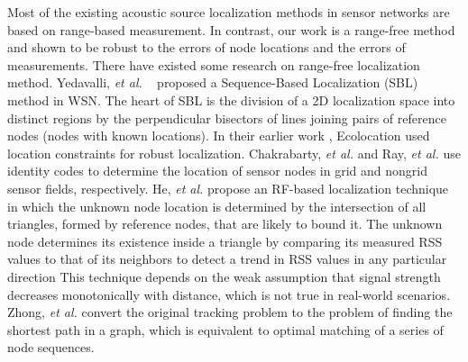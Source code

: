 Most of the existing acoustic source localization methods in sensor networks are based on range-based measurement.
In contrast, our work is a range-free method and shown to be robust to the errors of node locations and the errors of measurements.
There have existed some research on range-free localization method.
Yedavalli, \emph{et al.} ~\cite{yedavalli2008sequence} proposed a Sequence-Based Localization (SBL) method in WSN. 
The heart of SBL is the division of a 2D localization space into distinct regions by the perpendicular bisectors of lines joining pairs of reference nodes (nodes with known locations).
In their earlier work \cite{yedavalli2005ecolocation}, Ecolocation used location constraints for robust localization.
Chakrabarty, \emph{et al.} \cite{chakrabarty2002grid} and Ray, \emph{et al.} \cite{ray2004robust} use identity codes to determine the location of sensor nodes in grid and nongrid sensor fields, respectively. 
He, \emph{et al.} \cite{he2003range} propose an RF-based localization technique in which the unknown node location is determined by the intersection of all triangles,
formed by reference nodes, that are likely to bound it. The unknown node determines its existence inside a triangle by
comparing its measured RSS values to that of its neighbors to detect a trend in RSS values in any particular direction
This technique depends on the weak assumption that signal strength decreases monotonically with distance, which is not true in real-world scenarios.
Zhong, \emph{et al.} \cite{zhong2009tracking} convert the original tracking problem to the problem of finding the shortest path in a graph, which is equivalent to optimal matching of a series of node sequences. 
